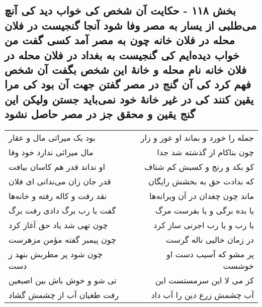 \begin{center}
\section*{بخش ۱۱۸ - حکایت آن شخص کی خواب دید کی آنچ می‌طلبی از یسار  به مصر وفا شود آنجا گنجیست در فلان محله در فلان خانه چون به مصر  آمد کسی گفت من خواب دیده‌ایم کی  گنجیست به بغداد در فلان محله در  فلان خانه نام محله و خانهٔ این شخص  بگفت آن شخص فهم کرد کی  آن گنج در مصر گفتن جهت آن بود  کی مرا یقین کنند کی در غیر  خانهٔ خود نمی‌باید جستن ولیکن این گنج یقین و محقق جز در مصر حاصل نشود}
\label{sec:sh118}
\begin{longtable}{l p{0.5cm} r}
بود یک میراثی مال و عقار
&&
جمله را خورد و بماند او عور و زار
\\
مال میراثی ندارد خود وفا
&&
چون بناکام از گذشته شد جدا
\\
او نداند قدر هم کاسان بیافت
&&
کو بکد و رنج و کسبش کم شتاف
\\
قدر جان زان می‌ندانی ای فلان
&&
که بدادت حق به بخشش رایگان
\\
نقد رفت و کاله رفته و خانه‌ها
&&
ماند چون چغدان در آن ویرانه‌ها
\\
گفت یا رب برگ دادی رفت برگ
&&
یا بده برگی و یا بفرست مرگ
\\
چون تهی شد یاد حق آغاز کرد
&&
یا رب و یا رب اجرنی ساز کرد
\\
چون پیمبر گفته مؤمن مزهرست
&&
در زمان خالیی ناله گرست
\\
چون شود پر مطربش بنهد ز دست
&&
پر مشو که آسیب دست او خوشست
\\
تی شو و خوش باش بین اصبعین
&&
کز می لا این سرمستست این
\\
رفت طغیان آب از چشمش گشاد
&&
آب چشمش زرع دین را آب داد
\\
\end{longtable}
\end{center}
